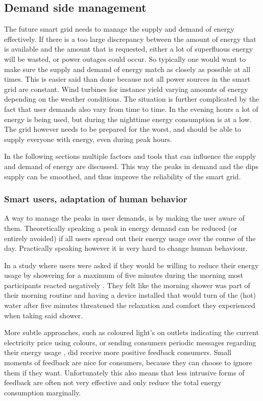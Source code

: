 \subsection{Demand side management}

The future smart grid needs to manage the supply and demand of energy effectively. If there is a too large discrepancy between the amount of energy that is available and the amount that is requested, either a lot of superfluous energy will be wasted, or power outages could occur.
So typically one would want to make sure the supply and demand of energy match as closely as possible at all times. This is easier said than done because not all power sources in the smart grid are constant. Wind turbines for instance yield varying amounts of energy depending on the weather conditions. The situation is further complicated by the fact that user demands also vary from time to time. In the evening hours a lot of energy is being used, but during the nighttime energy consumption is at a low. The grid however needs to be prepared for the worst, and should be able to supply everyone with energy, even during peak hours.

In the following sections multiple factors and tools that can influence the supply and demand of energy are discussed. This way the peaks in demand and the dips supply can be smoothed, and thus improve the reliability of the smart grid.

\subsubsection{Smart users, adaptation of human behavior}

A way to manage the peaks in user demands, is by making the user aware of them. Theoretically speaking a peak in energy demand can be reduced (or entirely avoided) if all users spread out their energy usage over the course of the day. Practically speaking however it is very hard to change human behaviour.

In a study where users were asked if they would be willing to reduce their energy usage by showering for a maximum of five minutes during the morning most participants reacted negatively \cite{GouldenBedwellRennick-EgglestoneEtAl2014}. They felt like the morning shower was part of their morning routine and having a device installed that would turn of the (hot) water after five minutes threatened the relaxation and comfort they experienced when taking said shower. 

More subtle approaches, such as coloured light's on outlets indicating the current electricity price using colours, or sending consumers periodic messages regarding their energy usage \cite{AyresRasemanShih2012}, did receive more positive feedback consumers. Small moments of feedback are nice for consumers, because they can choose to ignore them if they want. Unfortunately this also means that less intrusive forms of feedback are often not very effective and only reduce the total energy consumption marginally.

